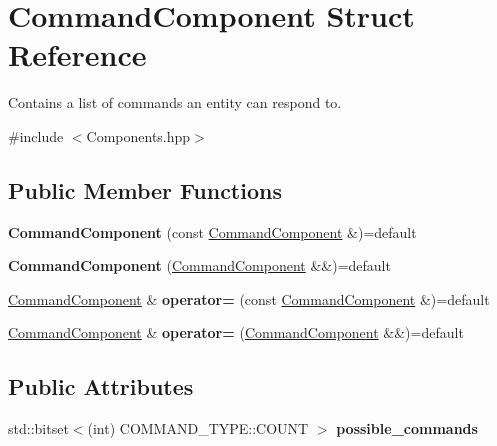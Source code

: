 \hypertarget{struct_command_component}{}\section{Command\+Component Struct Reference}
\label{struct_command_component}


Contains a list of commands an entity can respond to.  




{\ttfamily \#include $<$Components.\+hpp$>$}

\subsection*{Public Member Functions}
\begin{DoxyCompactItemize}
\item 
{\bfseries Command\+Component} (const \hyperlink{struct_command_component}{Command\+Component} \&)=default\hypertarget{struct_command_component_ae20d2b5b01dc704075a7172e186397be}{}\label{struct_command_component_ae20d2b5b01dc704075a7172e186397be}

\item 
{\bfseries Command\+Component} (\hyperlink{struct_command_component}{Command\+Component} \&\&)=default\hypertarget{struct_command_component_a0790e2d41ea4154a6deac0c0ea38fe1b}{}\label{struct_command_component_a0790e2d41ea4154a6deac0c0ea38fe1b}

\item 
\hyperlink{struct_command_component}{Command\+Component} \& {\bfseries operator=} (const \hyperlink{struct_command_component}{Command\+Component} \&)=default\hypertarget{struct_command_component_a90815988dd34eb9021e6b2ca0064be62}{}\label{struct_command_component_a90815988dd34eb9021e6b2ca0064be62}

\item 
\hyperlink{struct_command_component}{Command\+Component} \& {\bfseries operator=} (\hyperlink{struct_command_component}{Command\+Component} \&\&)=default\hypertarget{struct_command_component_a03ab285bb18d2b8c8fad9f425a5365a9}{}\label{struct_command_component_a03ab285bb18d2b8c8fad9f425a5365a9}

\end{DoxyCompactItemize}
\subsection*{Public Attributes}
\begin{DoxyCompactItemize}
\item 
std\+::bitset$<$(int) C\+O\+M\+M\+A\+N\+D\+\_\+\+T\+Y\+P\+E\+::\+C\+O\+U\+NT $>$ {\bfseries possible\+\_\+commands}\hypertarget{struct_command_component_abb0ee1003d2012c621f517a76369a067}{}\label{struct_command_component_abb0ee1003d2012c621f517a76369a067}

\end{DoxyCompactItemize}
